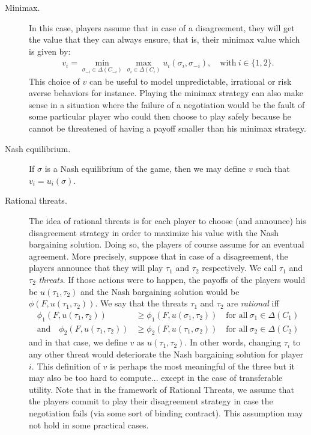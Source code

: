 \begin{description}
	\item[Minimax.] In this case, players assume that in case of a disagreement, they will get the value that they can always ensure, that is, their minimax value which is given by:
	\begin{align*}
		v_i = \min_{\sigma_{-i} \in \Delta(C_{-i})} \max_{\sigma_i \in \Delta(C_i)} u_i(\sigma_i, \sigma_{-i}), \quad \text{with} \ i \in \{1,2\}.
	\end{align*}
	This choice of $v$ can be useful to model unpredictable, irrational or risk averse behaviors for instance. Playing the minimax strategy can also make sense in a situation where the failure of a negotiation would be the fault of some particular player who could then choose to play safely because he cannot be threatened of having a payoff smaller than his minimax strategy.
	\item[Nash equilibrium.] If $\sigma$ is a Nash equilibrium of the game, then we may define $v$ such that $v_i = u_i(\sigma)$.
	\item[Rational threats.] The idea of rational threats is for each player to choose (and announce) his disagreement strategy in order to maximize his value with the Nash bargaining solution. Doing so, the players of course assume for an eventual agreement. More precisely, suppose that in case of a disagreement, the players announce that they will play $\tau_1$ and $\tau_2$ respectively. We call $\tau_1$ and $\tau_2$ \emph{threats}. If those actions were to happen, the payoffs of the players would be $u(\tau_1, \tau_2)$ and the Nash bargaining solution would be $\phi(F, u(\tau_1, \tau_2))$. We say that the threats $\tau_1$ and $\tau_2$ are \emph{rational} iff
	\begin{align*}
		\phi_1(F, u(\tau_1, \tau_2)) &\geq \phi_1(F, u(\sigma_1, \tau_2)) \quad \text{for all} \ \sigma_1 \in \Delta(C_1)\\
		\text{and} \quad \phi_2(F, u(\tau_1, \tau_2)) &\geq \phi_2(F, u(\tau_1, \sigma_2)) \quad \text{for all} \ \sigma_2 \in \Delta(C_2)
	\end{align*}
	and in that case, we define $v$ as $u(\tau_1, \tau_2)$. In other words, changing $\tau_i$ to any other threat would deteriorate the Nash bargaining solution for player $i$. This definition of $v$ is perhaps the most meaningful of the three but it may also be too hard to compute... except in the case of transferable utility. Note that in the framework of Rational Threats, we assume that the players commit to play their disagreement strategy in case the negotiation fails (via some sort of binding contract).  This assumption may not hold in some practical cases.
\end{description}



